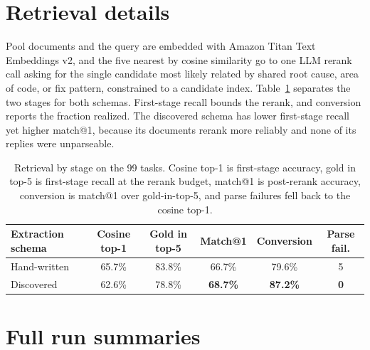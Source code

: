 \documentclass{article}
\begin{document}
\section{Retrieval details}
\label{app:retrieval}

Pool documents and the query are embedded with Amazon Titan Text Embeddings v2, and the five nearest by cosine similarity go to one LLM rerank call asking for the single candidate most likely related by shared root cause, area of code, or fix pattern, constrained to a candidate index. Table~\ref{tab:retrieval-stages} separates the two stages for both schemas. First-stage recall bounds the rerank, and conversion reports the fraction realized. The discovered schema has lower first-stage recall yet higher match@1, because its documents rerank more reliably and none of its replies were unparseable. 

\begin{table}[h]
\begin{center}
\begin{tabular}{@{}lccccc@{}}
\toprule
\textbf{Extraction schema} & \textbf{Cosine top-1} & \textbf{Gold in top-5} & \textbf{Match@1} & \textbf{Conversion} & \textbf{Parse fail.} \\
\midrule
Hand-written & 65.7\% & 83.8\% & 66.7\% & 79.6\% & 5 \\
Discovered & 62.6\% & 78.8\% & \textbf{68.7\%} & \textbf{87.2\%} & \textbf{0} \\
\bottomrule
\end{tabular}
\end{center}
\caption{Retrieval by stage on the 99 tasks. Cosine top-1 is first-stage accuracy, gold in top-5 is first-stage recall at the rerank budget, match@1 is post-rerank accuracy, conversion is match@1 over gold-in-top-5, and parse failures fell back to the cosine top-1.}
\label{tab:retrieval-stages}
\end{table}

\section{Full run summaries}
\label{app:summaries}
\end{document}
